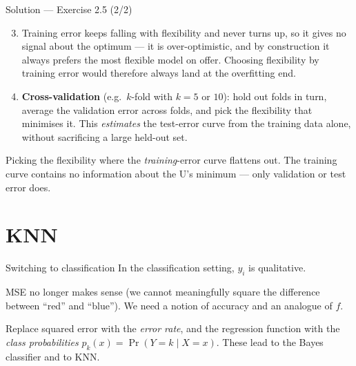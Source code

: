 \documentclass[aspectratio=169,11pt]{beamer}
\begin{document}
\begin{frame}{Solution --- Exercise 2.5 (2/2)}
\begin{solutionbox}
\begin{enumerate}\setcounter{enumi}{2}
  \item Training error keeps falling with flexibility and never turns
        up, so it gives no signal about the optimum --- it is
        over-optimistic, and by construction it always prefers the
        most flexible model on offer. Choosing flexibility by training
        error would therefore always land at the overfitting end.
  \item \textbf{Cross-validation} (e.g.\ $k$-fold with $k=5$ or
        $10$): hold out folds in turn, average the validation error
        across folds, and pick the flexibility that minimises it. This
        \emph{estimates} the test-error curve from the training data
        alone, without sacrificing a large held-out set.
\end{enumerate}
\end{solutionbox}
\begin{mistake}
Picking the flexibility where the
\emph{training}-error curve flattens out. The training curve contains
no information about the U's minimum --- only validation or test error
does.
\end{mistake}
\end{frame}






\section{KNN}

\begin{frame}{Switching to classification}
  In the classification setting, $y_i$ is qualitative.
  \begin{readme}
    MSE no longer makes sense (we cannot meaningfully square the
    difference between ``red'' and ``blue''). We need a notion of
    accuracy and an analogue of $f$.
  \end{readme}
  \begin{takeaway}
    Replace squared error with the \emph{error rate}, and the
    regression function with the \emph{class probabilities}
    $p_k(x)=\Pr(Y=k\mid X=x)$. These lead to the Bayes classifier and
    to KNN.
  \end{takeaway}
\end{frame}
\end{document}
